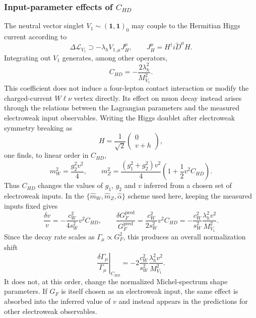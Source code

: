 
\subsubsection{Input-parameter effects of $C_{HD}$}
\label{sec:v1-chd-input}

The neutral vector singlet $V_1\sim(\mathbf 1,\mathbf 1)_0$ may couple to
the Hermitian Higgs current according to
\begin{equation}
    \Delta\mathcal L_{V_1}
    \supset
    -\lambda_h V_{1,\mu}J_H^\mu,
    \qquad
    J_H^\mu=H^\dagger i\overleftrightarrow D^\mu H.
\end{equation}
Integrating out $V_1$ generates, among other operators,
\begin{equation}
    C_{HD}=-\frac{2\lambda_h^2}{M_{V_1}^2}.
    \label{eq:v1-chd-matching-short}
\end{equation}
This coefficient does not induce a four-lepton contact interaction or
modify the charged-current $W\ell\nu$ vertex directly.  Its effect on
muon decay instead arises through the relations between the Lagrangian
parameters and the measured electroweak input observables.  Writing the
Higgs doublet after electroweak symmetry breaking as
\begin{equation}
    H=\frac{1}{\sqrt2}
      \begin{pmatrix}0\\v+h\end{pmatrix},
\end{equation}
one finds, to linear order in $C_{HD}$,
\begin{equation}
    m_W^2=\frac{g_2^2v^2}{4},
    \qquad
    m_Z^2=\frac{(g_1^2+g_2^2)v^2}{4}
    \left(1+\frac12v^2C_{HD}\right).
    \label{eq:chd-input-masses-short}
\end{equation}
Thus $C_{HD}$ changes the values of $g_1$, $g_2$ and $v$ inferred from a
chosen set of electroweak inputs.  In the
$\{\widehat m_W,\widehat m_Z,\widehat\alpha\}$ scheme used here, keeping
the measured inputs fixed gives
\begin{equation}
    \frac{\delta v}{v}
    =-\frac{c_W^2}{4s_W^2}v^2C_{HD},
    \qquad
    \frac{\delta G_F^{\mathrm{pred}}}{G_F^{\mathrm{pred}}}
    =\frac{c_W^2}{2s_W^2}v^2C_{HD}
    =-\frac{c_W^2}{s_W^2}
      \frac{\lambda_h^2v^2}{M_{V_1}^2}.
    \label{eq:chd-input-gf-short}
\end{equation}
Since the decay rate scales as $\Gamma_\mu\propto G_F^2$, this produces
an overall normalization shift
\begin{equation}
    \left.\frac{\delta\Gamma_\mu}{\Gamma_\mu}\right|_{C_{HD}}
    =-2\frac{c_W^2}{s_W^2}
      \frac{\lambda_h^2v^2}{M_{V_1}^2}.
\end{equation}
It does not, at this order, change the normalized Michel-spectrum shape
parameters.  If $G_F$ is itself chosen as an electroweak input, the same
effect is absorbed into the inferred value of $v$ and instead appears in
the predictions for other electroweak observables.

